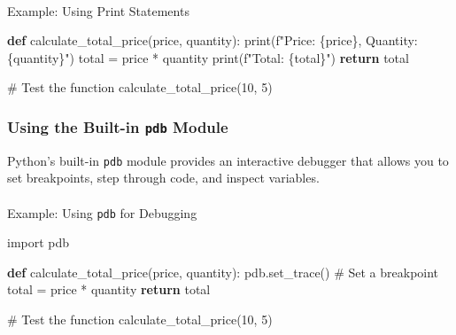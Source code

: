 \documentclass[
  letterpaper,
  DIV=11,
  numbers=noendperiod]{scrreprt}
\makeatletter
\let\oldparagraph\paragraph
\renewcommand{\paragraph}{
    \@ifstar
      \xxxParagraphStar
      \xxxParagraphNoStar
  }
\newcommand{\xxxParagraphStar}[1]{\oldparagraph*{#1}\mbox{}}
\newcommand{\xxxParagraphNoStar}[1]{\oldparagraph{#1}\mbox{}}
\newenvironment{Shaded}{\begin{snugshade}}{\end{snugshade}}
\newcommand{\BuiltInTok}[1]{\textcolor[rgb]{0.00,0.23,0.31}{#1}}
\newcommand{\CommentTok}[1]{\textcolor[rgb]{0.37,0.37,0.37}{#1}}
\newcommand{\ControlFlowTok}[1]{\textcolor[rgb]{0.00,0.23,0.31}{\textbf{#1}}}
\newcommand{\DecValTok}[1]{\textcolor[rgb]{0.68,0.00,0.00}{#1}}
\newcommand{\ImportTok}[1]{\textcolor[rgb]{0.00,0.46,0.62}{#1}}
\newcommand{\KeywordTok}[1]{\textcolor[rgb]{0.00,0.23,0.31}{\textbf{#1}}}
\newcommand{\NormalTok}[1]{\textcolor[rgb]{0.00,0.23,0.31}{#1}}
\newcommand{\OperatorTok}[1]{\textcolor[rgb]{0.37,0.37,0.37}{#1}}
\newcommand{\SpecialCharTok}[1]{\textcolor[rgb]{0.37,0.37,0.37}{#1}}
\newcommand{\SpecialStringTok}[1]{\textcolor[rgb]{0.13,0.47,0.30}{#1}}
\makeatother
\begin{document}
\paragraph{Example: Using Print
Statements}\label{example-using-print-statements}

\begin{Shaded}
\begin{Highlighting}[]
\KeywordTok{def}\NormalTok{ calculate\_total\_price(price, quantity):}
    \BuiltInTok{print}\NormalTok{(}\SpecialStringTok{f"Price: }\SpecialCharTok{\{}\NormalTok{price}\SpecialCharTok{\}}\SpecialStringTok{, Quantity: }\SpecialCharTok{\{}\NormalTok{quantity}\SpecialCharTok{\}}\SpecialStringTok{"}\NormalTok{)}
\NormalTok{    total }\OperatorTok{=}\NormalTok{ price }\OperatorTok{*}\NormalTok{ quantity}
    \BuiltInTok{print}\NormalTok{(}\SpecialStringTok{f"Total: }\SpecialCharTok{\{}\NormalTok{total}\SpecialCharTok{\}}\SpecialStringTok{"}\NormalTok{)}
    \ControlFlowTok{return}\NormalTok{ total}

\CommentTok{\# Test the function}
\NormalTok{calculate\_total\_price(}\DecValTok{10}\NormalTok{, }\DecValTok{5}\NormalTok{)}
\end{Highlighting}
\end{Shaded}

\subsubsection{\texorpdfstring{Using the Built-in \texttt{pdb}
Module}{Using the Built-in pdb Module}}\label{using-the-built-in-pdb-module}

Python's built-in \texttt{pdb} module provides an interactive debugger
that allows you to set breakpoints, step through code, and inspect
variables.

\paragraph{\texorpdfstring{Example: Using \texttt{pdb} for
Debugging}{Example: Using pdb for Debugging}}\label{example-using-pdb-for-debugging}

\begin{Shaded}
\begin{Highlighting}[]
\ImportTok{import}\NormalTok{ pdb}

\KeywordTok{def}\NormalTok{ calculate\_total\_price(price, quantity):}
\NormalTok{    pdb.set\_trace()  }\CommentTok{\# Set a breakpoint}
\NormalTok{    total }\OperatorTok{=}\NormalTok{ price }\OperatorTok{*}\NormalTok{ quantity}
    \ControlFlowTok{return}\NormalTok{ total}

\CommentTok{\# Test the function}
\NormalTok{calculate\_total\_price(}\DecValTok{10}\NormalTok{, }\DecValTok{5}\NormalTok{)}
\end{Highlighting}
\end{Shaded}
\end{document}
